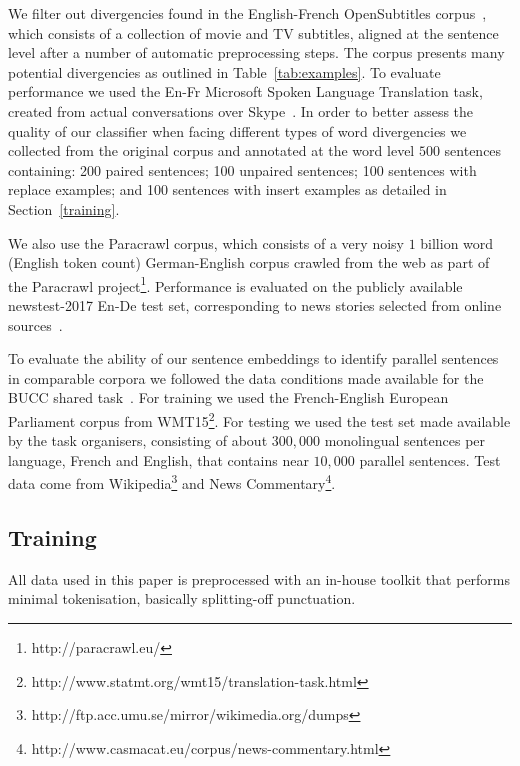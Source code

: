 \documentclass[11pt,a4paper]{article}
\begin{document}
We filter out divergencies found in the English-French OpenSubtitles corpus~\cite{LisonTiedemann2016}, which consists of a collection of movie and TV subtitles, aligned at the sentence level after a number of automatic preprocessing steps. 
The corpus presents many potential divergencies as outlined in Table~\ref{tab:examples}. 
To evaluate performance we used the En-Fr Microsoft Spoken Language Translation task, created from actual conversations over Skype~\cite{mslt-corpus-iwslt-2016-release}. 
In order to better assess the quality of our classifier when facing different types of word divergencies we collected from the original corpus and annotated at the word level $500$ sentences containing:
200 paired sentences;
100 unpaired sentences;
100 sentences with replace examples; and
100 sentences with insert examples as detailed in Section~\ref{training}.

We also use the Paracrawl corpus, which consists of a very noisy $1$ billion word (English token count) German-English corpus crawled from the web as part of the Paracrawl project\footnote{http://paracrawl.eu/}.
Performance is evaluated on the publicly available newstest-2017 En-De test set, corresponding to news stories selected from online sources~\cite{W17-4717}.

To evaluate the ability of our sentence embeddings to identify parallel sentences in comparable corpora we followed the data conditions made available for the BUCC shared task~\cite{ZWEIGENBAUM18.12}. 
For training we used the French-English European Parliament corpus from WMT15\footnote{http://www.statmt.org/wmt15/translation-task.html}.
For testing we used the test set made available by the task organisers, consisting of about $300,000$ monolingual sentences per language, French and English, that contains near $10,000$ parallel sentences.
Test data come from Wikipedia\footnote{http://ftp.acc.umu.se/mirror/wikimedia.org/dumps} and News Commentary\footnote{http://www.casmacat.eu/corpus/news-commentary.html}.

\subsection{Training}

All data used in this paper is preprocessed with an in-house toolkit that performs minimal tokenisation, basically splitting-off punctuation.
\end{document}
